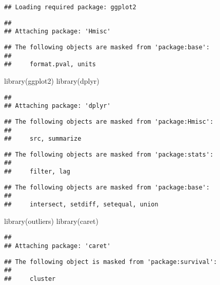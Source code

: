 \documentclass[
]{article}
\newenvironment{Shaded}{\begin{snugshade}}{\end{snugshade}}
\newcommand{\FunctionTok}[1]{\textcolor[rgb]{0.00,0.00,0.00}{#1}}
\newcommand{\NormalTok}[1]{#1}
\begin{document}
\begin{verbatim}
## Loading required package: ggplot2
\end{verbatim}

\begin{verbatim}
## 
## Attaching package: 'Hmisc'
\end{verbatim}

\begin{verbatim}
## The following objects are masked from 'package:base':
## 
##     format.pval, units
\end{verbatim}

\begin{Shaded}
\begin{Highlighting}[]
\FunctionTok{library}\NormalTok{(ggplot2)}
\FunctionTok{library}\NormalTok{(dplyr)}
\end{Highlighting}
\end{Shaded}

\begin{verbatim}
## 
## Attaching package: 'dplyr'
\end{verbatim}

\begin{verbatim}
## The following objects are masked from 'package:Hmisc':
## 
##     src, summarize
\end{verbatim}

\begin{verbatim}
## The following objects are masked from 'package:stats':
## 
##     filter, lag
\end{verbatim}

\begin{verbatim}
## The following objects are masked from 'package:base':
## 
##     intersect, setdiff, setequal, union
\end{verbatim}

\begin{Shaded}
\begin{Highlighting}[]
\FunctionTok{library}\NormalTok{(outliers)}
\FunctionTok{library}\NormalTok{(caret)}
\end{Highlighting}
\end{Shaded}

\begin{verbatim}
## 
## Attaching package: 'caret'
\end{verbatim}

\begin{verbatim}
## The following object is masked from 'package:survival':
## 
##     cluster
\end{verbatim}
\end{document}
